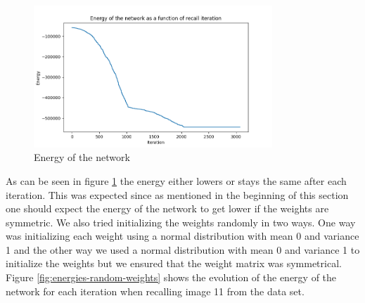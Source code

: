 \documentclass[a4paper]{article}
\begin{document}
\begin{figure}[ht]
    \centering
    \includegraphics[width=0.8\textwidth]{Labs/Lab 3/images/energy.png}
    \caption{Energy of the network}
    \label{fig:energies}
\end{figure}

As can be seen in figure \ref{fig:energies} the energy either lowers or stays the same after each iteration. This was expected since as mentioned in the beginning of this section one should expect the energy of the network to get lower if the weights are symmetric. We also tried initializing the weights randomly in two ways. One way was initializing each weight using a normal distribution with mean 0 and variance 1 and the other way we used a normal distribution with mean 0 and variance 1 to initialize the weights but we ensured that the weight matrix was symmetrical. Figure \ref{fig:energies-random-weights} shows the evolution of the energy of the network for each iteration when recalling image 11 from the data set.
\end{document}
